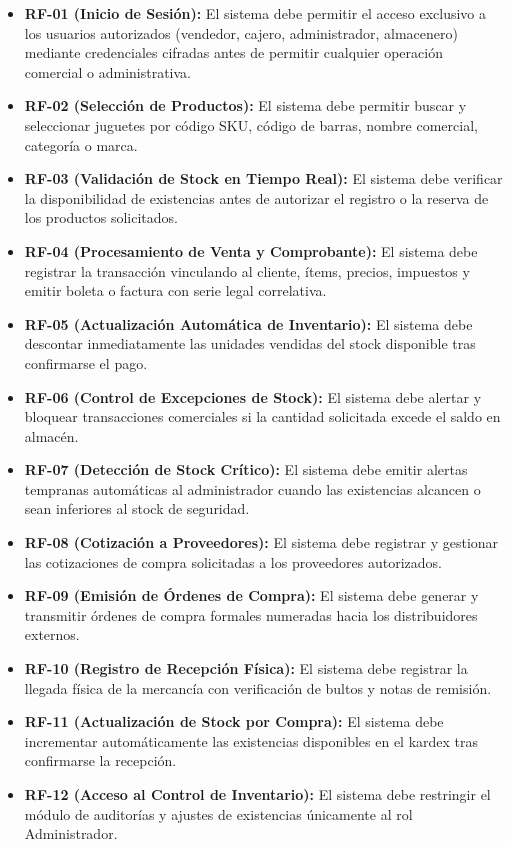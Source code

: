 \documentclass[12pt,a4paper]{article}
\begin{document}
\begin{itemize}
  \item \textbf{RF-01 (Inicio de Sesión):} El sistema debe permitir el acceso exclusivo a los usuarios autorizados (vendedor, cajero, administrador, almacenero) mediante credenciales cifradas antes de permitir cualquier operación comercial o administrativa.
  \item \textbf{RF-02 (Selección de Productos):} El sistema debe permitir buscar y seleccionar juguetes por código SKU, código de barras, nombre comercial, categoría o marca.
  \item \textbf{RF-03 (Validación de Stock en Tiempo Real):} El sistema debe verificar la disponibilidad de existencias antes de autorizar el registro o la reserva de los productos solicitados.
  \item \textbf{RF-04 (Procesamiento de Venta y Comprobante):} El sistema debe registrar la transacción vinculando al cliente, ítems, precios, impuestos y emitir boleta o factura con serie legal correlativa.
  \item \textbf{RF-05 (Actualización Automática de Inventario):} El sistema debe descontar inmediatamente las unidades vendidas del stock disponible tras confirmarse el pago.
  \item \textbf{RF-06 (Control de Excepciones de Stock):} El sistema debe alertar y bloquear transacciones comerciales si la cantidad solicitada excede el saldo en almacén.
  \item \textbf{RF-07 (Detección de Stock Crítico):} El sistema debe emitir alertas tempranas automáticas al administrador cuando las existencias alcancen o sean inferiores al stock de seguridad.
  \item \textbf{RF-08 (Cotización a Proveedores):} El sistema debe registrar y gestionar las cotizaciones de compra solicitadas a los proveedores autorizados.
  \item \textbf{RF-09 (Emisión de Órdenes de Compra):} El sistema debe generar y transmitir órdenes de compra formales numeradas hacia los distribuidores externos.
  \item \textbf{RF-10 (Registro de Recepción Física):} El sistema debe registrar la llegada física de la mercancía con verificación de bultos y notas de remisión.
  \item \textbf{RF-11 (Actualización de Stock por Compra):} El sistema debe incrementar automáticamente las existencias disponibles en el kardex tras confirmarse la recepción.
  \item \textbf{RF-12 (Acceso al Control de Inventario):} El sistema debe restringir el módulo de auditorías y ajustes de existencias únicamente al rol Administrador.

\end{itemize}
\end{document}
